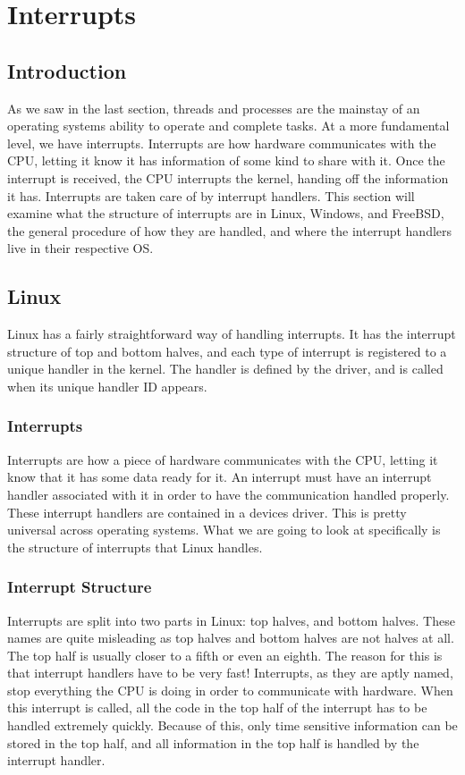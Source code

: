 \documentclass[10pt,letterpaper,onecolumn,draftclsnofoot]{IEEEtran}
\begin{document}
\section{Interrupts}
\subsection{Introduction}
As we saw in the last section, threads and processes are the mainstay of an operating systems ability to operate and complete tasks. At a more fundamental level, we have interrupts. Interrupts are how hardware communicates with the CPU, letting it know it
has information of some kind to share with it. Once the interrupt is received,
the CPU interrupts the kernel, handing off the information it has. Interrupts
are taken care of by interrupt handlers. This section will examine what the structure of
interrupts are in Linux, Windows, and FreeBSD, the general procedure of
how they are handled, and where the interrupt handlers live in their respective OS.

\subsection{Linux}
Linux has a fairly straightforward way of handling interrupts. It has the interrupt
structure of top and bottom halves, and each type of interrupt is registered
to a unique handler in the kernel. The handler is defined by the driver, and
is called when its unique handler ID appears.

\subsubsection{Interrupts}
Interrupts are how a piece of hardware communicates with the CPU, letting it
know that it has some data ready for it. An interrupt must have an interrupt
handler associated with it in order to have the communication handled properly.
These interrupt handlers are contained in a devices driver. This is pretty
universal across operating systems. What we are going to look at specifically
is the structure of interrupts that Linux handles. \cite{robertlove2010}

\subsubsection{Interrupt Structure}
Interrupts are split into two parts in Linux: top halves, and bottom halves.
These names are quite misleading as top halves and bottom halves are not halves
at all. The top half is usually closer to a fifth or even an eighth. The reason
for this is that interrupt handlers have to be very fast! Interrupts, as they
are aptly named, stop everything the CPU is doing in order to communicate with
hardware. When this interrupt is called, all the code in the top half of the
interrupt has to be handled extremely quickly. Because of this, only time sensitive
information can be stored in the top half, and all information in the top half
is handled by the interrupt handler.
\end{document}
